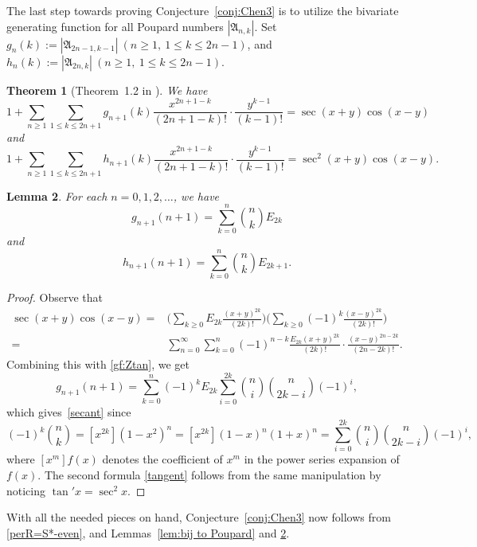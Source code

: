 \documentclass[11pt,reqno]{amsart}
\numberwithin{equation}{section}
\theoremstyle{plain}
\newtheorem{theorem}{Theorem}[section]
\newtheorem{lemma}[theorem]{Lemma}
\theoremstyle{definition}
\def\A{\mathfrak{A}}
\begin{document}
The last step towards proving Conjecture~\ref{conj:Chen3} is to utilize the bivariate generating function for all Poupard numbers $|\A_{n,k}|$. Set $g_n(k):=|\A_{2n-1,k-1}|~(n\ge 1,~1\le k\le2n-1)$, and $h_n(k):=|\A_{2n,k}|~(n\ge1,~1\le k\le 2n-1)$.
\begin{theorem}[Theorem~1.2 in \cite{FH}]
We have
\begin{equation}
\label{gf:Ztan}
1+\sum_{n\ge 1}\sum_{1\le k\le 2n+1}g_{n+1}(k)\frac{x^{2n+1-k}}{(2n+1-k)!}\cdot\frac{y^{k-1}}{(k-1)!}=\sec(x+y)\cos(x-y)
\end{equation}
and
\begin{equation}
\label{gf:Zsec}
1+\sum_{n\ge 1}\sum_{1\le k\le 2n+1}h_{n+1}(k)\frac{x^{2n+1-k}}{(2n+1-k)!}\cdot\frac{y^{k-1}}{(k-1)!}=\sec^2(x+y)\cos(x-y).
\end{equation}
\end{theorem}

\begin{lemma}\label{lem:central Poupard}
For each $n=0,1,2,\ldots$, we have
\begin{equation}\label{secant}
g_{n+1}(n+1)=\sum_{k=0}^n\binom{n}{k}E_{2k}
\end{equation}
and
\begin{equation}\label{tangent}
h_{n+1}(n+1)=\sum_{k=0}^n\binom{n}{k}E_{2k+1}.
\end{equation}
\end{lemma}
\begin{proof} Observe that
\begin{align*}
\sec(x+y)\cos(x-y)=&\biggl(\sum_{k\geq0}E_{2k}\frac{(x+y)^{2k}}{(2k)!}\biggr)
\biggl(\sum_{k\geq0}(-1)^k\frac{(x-y)^{2k}}{(2k)!}\biggr)
\\=&\sum_{n=0}^\infty\sum_{k=0}^n(-1)^{n-k}\frac{E_{2k}(x+y)^{2k}}{(2k)!}\cdot\frac{(x-y)^{2n-2k}}{(2n-2k)!}.
\end{align*}
Combining this with \eqref{gf:Ztan}, we get
$$g_{n+1}(n+1)=\sum_{k=0}^n(-1)^kE_{2k}\sum_{i=0}^{2k}\binom{n}{i}\binom{n}{2k-i}(-1)^{i},$$
which gives~\eqref{secant} since
$$
(-1)^k\binom{n}{k}=[x^{2k}](1-x^2)^n=[x^{2k}](1-x)^n(1+x)^n=\sum_{i=0}^{2k}\binom{n}{i}\binom{n}{2k-i}(-1)^{i},
$$ where $[x^m]f(x)$ denotes the coefficient of $x^m$ in the power series expansion of $f(x)$.
The second formula \eqref{tangent} follows from the same manipulation by noticing
$\tan'x=\sec^2 x$.
\end{proof}

With all the needed pieces on hand, Conjecture~\ref{conj:Chen3} now follows from \eqref{perR=S*-even}, and Lemmas~\ref{lem:bij to Poupard} and \ref{lem:central Poupard}.
\end{document}
